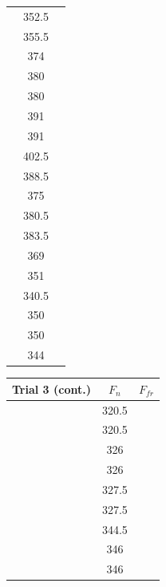 \documentclass[12pt]{article}
\begin{document}
\begin{table}
\begin{tabular}[t]{| c  c  c |}
                & 352.5         &           \\
                & 355.5         &           \\
                & 374           &           \\
                & 380           &           \\
                & 380           &           \\
                & 391           &           \\
                & 391           &           \\
                & 402.5         &           \\
                & 388.5         &           \\
                & 375           &           \\
                & 380.5         &           \\
                & 383.5         &           \\
                & 369           &           \\
                & 351           &           \\
                & 340.5         &           \\
                & 350           &           \\
                & 350           &           \\
                & 344           &           \\
                \hline
    \end{tabular}
    \hfill
    \begin{tabular}[t]{| c c c |}
        \hline
        Trial 3 (cont.) & $F_{n}$       & $F_{fr}$  \\
        \hline
                & 320.5         &           \\
                & 320.5         &           \\
                & 326           &           \\
                & 326           &           \\
                & 327.5         &           \\
                & 327.5         &           \\
                & 344.5         &           \\
                & 346           &           \\
                & 346           &           \\

\end{tabular}
\end{table}
\end{document}
